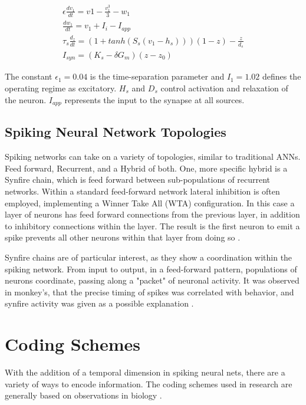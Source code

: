    \begin{align}
      \epsilon \frac{dv_1}{dt} = v1 - \frac{v_1^3}{3} - w_1 \\
      \frac{dw_1}{dt} = v_1 + I_i - I_{app} \\
      \tau_s \frac{d_z}{dt} = (1 + tanh(S_s(v_1 - h_s)))(1 - z) - \frac{z}{d_s}
      \\
      I_{syn} = (K_s - \delta G_m)(z - z_0)
    \end{align}

    The constant $\epsilon_1 = 0.04$ is the time-separation parameter and
    $I_1 = 1.02$ defines the operating regime as excitatory. $H_s$ and $D_s$
    control activation and relaxation of the neuron. $I_{app}$ represents the
    input to the synapse at all sources.

    
    \subsection{Spiking Neural Network Topologies}
    Spiking networks can take on a variety of topologies, similar to traditional
    ANNs. Feed forward, Recurrent, and a Hybrid of both. One, more specific
    hybrid is a Synfire chain, which is feed forward between sub-populations of
    recurrent networks. Within a standard feed-forward network lateral
    inhibition is often employed, implementing a Winner Take All (WTA)
    configuration. In this case a layer of neurons has feed forward connections
    from the previous layer, in addition to inhibitory connections within the
    layer. The result is the first neuron to emit a spike prevents all other
    neurons within that layer from doing so \cite{ponulak_2011}.
    
    Synfire chains are of particular interest, as they show a coordination
    within the spiking network. From input to output, in a feed-forward pattern,
    populations of neurons coordinate, passing along a "packet" of neuronal
    activity. It was observed in monkey's, that the precise timing of spikes was
    correlated with behavior, and synfire activity was given as a possible
    explanation \cite{aertsen_1996}.

    
    \section{Coding Schemes}
    With the addition of a temporal dimension in spiking neural nets, there are
    a variety of ways to encode information. The coding schemes used in research
    are generally based on observations in biology \cite{ponulak_2011}.
    
